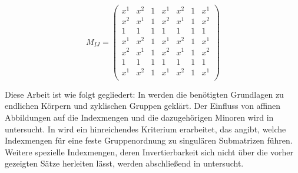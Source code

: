\begin{equation*}
    M_{IJ} = \left( \begin{array}{cc|ccc|cc}
        x^1     & x^{2} & 1     & x^{1} & x^{2} & 1 & x^{1} \\
        x^{2}   & x^{1} & 1     & x^{2} & x^{1} & 1 & x^{2} \\
        \hline
        1       & 1     & 1     & 1     & 1     & 1 & 1     \\
        x^{1}   & x^{2} & 1     & x^{1} & x^{2} & 1 & x^{1} \\
        x^{2}   & x^{1} & 1     & x^{2} & x^{1} & 1 & x^{2} \\
        \hline
        1       & 1     & 1     & 1     & 1     & 1 & 1     \\
        x^1     & x^2   & 1     & x^1   & x^2   & 1 & x^1   \\
    \end{array} \right)
\end{equation*}

Diese Arbeit ist wie folgt gegliedert: In  werden die benötigten Grundlagen zu endlichen Körpern und zyklischen Gruppen geklärt. Der Einfluss von affinen Abbildungen auf die Indexmengen und die dazugehörigen Minoren wird in  untersucht. In  wird ein hinreichendes Kriterium erarbeitet, das angibt, welche Indexmengen für eine feste Gruppenordnung zu singulären Submatrizen führen. Weitere spezielle Indexmengen, deren Invertierbarkeit sich nicht über die vorher gezeigten Sätze herleiten lässt, werden abschließend in  untersucht.
